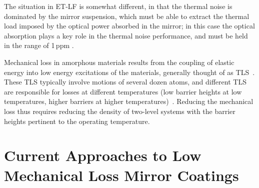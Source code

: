 The situation in \ac{ET-LF}    is somewhat different, in that the thermal noise is dominated by the mirror suspension, which must be able to extract the thermal load imposed by the optical power absorbed in the mirror; in this case the optical absorption plays a key role in the thermal noise performance, and must be held in the range of 1\,ppm \cite{HiEA2011}.


Mechanical loss in amorphous materials results from the coupling of elastic energy into low energy excitations of the materials, generally thought of as \ac{TLS}~\cite{braginsky1985systems,bommel1956dislocations}. These \ac{TLS} typically involve motions of several dozen atoms, and different \ac{TLS} are responsible for losses at different temperatures (low barrier heights at low temperatures, higher barriers at higher temperatures)~\cite{hamdan2014molecular,trinastic2016molecular}. Reducing the mechanical loss thus requires reducing the density of two-level systems with the barrier heights pertinent to the operating temperature. 


\section{Current Approaches to Low Mechanical Loss Mirror Coatings}


